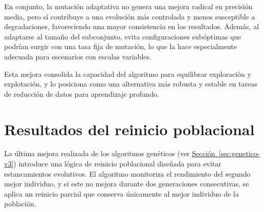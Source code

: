 En conjunto, la mutación adaptativa no genera una mejora radical en precisión media,
pero sí contribuye a una evolución más controlada y menos susceptible a degradaciones, favoreciendo una mayor consistencia en los resultados.
Además, al adaptarse al tamaño del subconjunto, evita configuraciones subóptimas que podrían surgir con una tasa fija de mutación,
lo que la hace especialmente adecuada para escenarios con escalas variables.

Esta mejora consolida la capacidad del algoritmo para equilibrar exploración y explotación,
y lo posiciona como una alternativa más robusta y estable en tareas de reducción de datos para aprendizaje profundo.


\section{Resultados del reinicio poblacional}\label{sec:resultados-reinicio-poblacional}
La última mejora realizada de los algoritmos genéticos (ver \hyperref[sec:genetico-v3]{Sección~\ref*{sec:genetico-v3}})
introduce una lógica de reinicio poblacional diseñada para evitar estancamientos evolutivos.
El algoritmo monitoriza el rendimiento del segundo mejor individuo, y si este no mejora durante dos generaciones consecutivas,
se aplica un reinicio parcial que conserva únicamente al mejor individuo de la población.

